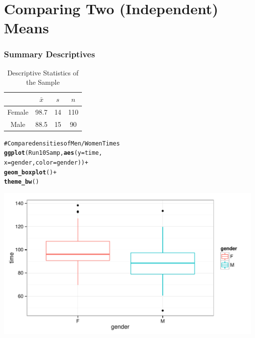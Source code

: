 \documentclass{beamer}\usepackage{graphicx, color}
\makeatletter
\def\maxwidth{ %
  \ifdim\Gin@nat@width>\linewidth
    \linewidth
  \else
    \Gin@nat@width
  \fi
}
\newcommand{\hlfunctioncall}[1]{\textcolor[rgb]{0.501960784313725,0,0.329411764705882}{\textbf{#1}}}%
\newcommand{\hlcomment}[1]{\textcolor[rgb]{0.180392156862745,0.6,0.341176470588235}{#1}}%
\newenvironment{kframe}{%
 \def\at@end@of@kframe{}%
 \ifinner\ifhmode%
  \def\at@end@of@kframe{\end{minipage}}%
  \begin{minipage}{\columnwidth}%
 \fi\fi%
 \def\FrameCommand##1{\hskip\@totalleftmargin \hskip-\fboxsep
 \colorbox{shadecolor}{##1}\hskip-\fboxsep
     \hskip-\linewidth \hskip-\@totalleftmargin \hskip\columnwidth}%
 \MakeFramed {\advance\hsize-\width
   \@totalleftmargin\z@ \linewidth\hsize
   \@setminipage}}%
 {\par\unskip\endMakeFramed%
 \at@end@of@kframe}
\newenvironment{knitrout}{}{} %
\makeatother
\begin{document}
\section{Comparing Two (Independent) Means}


\begin{frame}[fragile]
  \frametitle{Summary Descriptives}


  
  \begin{table}
  \caption{Descriptive Statistics of the Sample}
  \begin{tabular}{c | c c c}
  & $\bar{x}$ & $s$ & $n$ \\
  \hline\hline
  Female & 98.7 & 14 & 110 \\
  Male & 88.5 & 15 & 90 \\
  \hline
  
  \end{tabular}
  \end{table}
\end{frame}

\begin{frame}
\begin{knitrout}
\color{fgcolor}\begin{kframe}
\begin{alltt}
\hlcomment{# Compare densities of Men/Women Times}
\hlfunctioncall{ggplot}(Run10Samp, \hlfunctioncall{aes}(y = time, 
                      x = gender, color = gender)) +
        \hlfunctioncall{geom_boxplot}() +
        \hlfunctioncall{theme_bw}()
\end{alltt}
\end{kframe}

{\centering \includegraphics[width=\maxwidth]{figure/GenderDist} 

}


\end{knitrout}

\end{frame}
\end{document}
